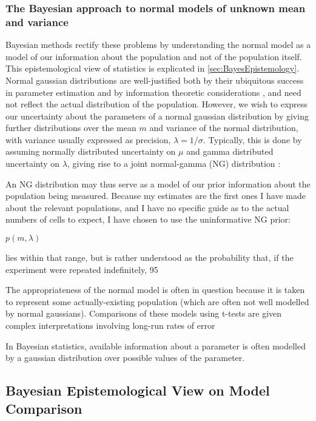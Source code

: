 \subsubsection{The Bayesian approach to normal models of unknown mean and variance}
Bayesian methods rectify these problems by understanding the normal model as a model of our information about the population and not of the population itself. This epistemological view of statistics is explicated in \autoref{sec:BayesEpistemology}. Normal gaussian distributions are well-justified both by their ubiquitous success in parameter estimation and by information theoretic considerations \cite{Jaynes2003}, and need not reflect the actual distribution of the population. However, we wish to express our uncertainty about the parameters of a normal gaussian distribution by giving further distributions over the mean $m$ and variance of the normal distribution, with variance usually expressed as precision, $\lambda = 1/\sigma$. Typically, this is done by  assuming normally distributed uncertainty on $\mu$ and gamma distributed uncertainty on $\lambda$, giving rise to a joint normal-gamma (NG) distribution \cite{Bernardo2000}:





An NG distribution may thus serve as a model of our prior information about the population being measured. Because my estimates are the first ones I have made about the relevant populations, and I have no specific guide as to the actual numbers of cells to expect, I have chosen to use the uninformative NG prior:

$p(m,\lambda)$


lies within that range, but is rather understood as the probability that, if the experiment were repeated indefinitely, 95

The appropriateness of the normal model is often in question because it is taken to represent some actually-existing population (which are often not well modelled by normal gaussians). Comparisons of these models using t-tests are given complex interpretations involving long-run rates of error

In Bayesian statistics, available information about a parameter is often modelled by a gaussian distribution over possible values of the parameter. 



\subsection{Bayesian Epistemological View on Model Comparison}




